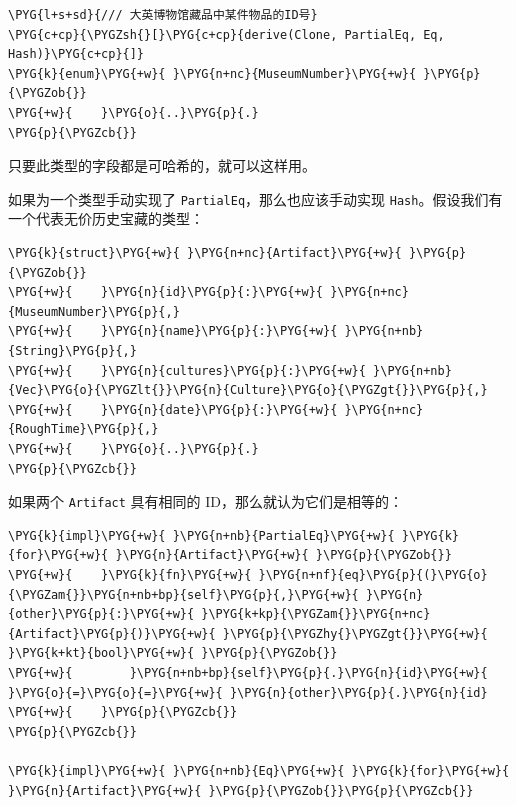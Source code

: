 \begin{Verbatim}[commandchars=\\\{\},breaklines=true,breakanywhere=true,fontsize=\codefont,xleftmargin=17bp]
\PYG{l+s+sd}{/// 大英博物馆藏品中某件物品的ID号}
\PYG{c+cp}{\PYGZsh{}[}\PYG{c+cp}{derive(Clone, PartialEq, Eq, Hash)}\PYG{c+cp}{]}
\PYG{k}{enum}\PYG{+w}{ }\PYG{n+nc}{MuseumNumber}\PYG{+w}{ }\PYG{p}{\PYGZob{}}
\PYG{+w}{    }\PYG{o}{..}\PYG{p}{.}
\PYG{p}{\PYGZcb{}}
\end{Verbatim}

只要此类型的字段都是可哈希的，就可以这样用。

如果为一个类型手动实现了 \texttt{PartialEq}，那么也应该手动实现 \texttt{Hash}。假设我们有一个代表无价历史宝藏的类型：

\begin{Verbatim}[commandchars=\\\{\},breaklines=true,breakanywhere=true,fontsize=\codefont,xleftmargin=17bp]
\PYG{k}{struct}\PYG{+w}{ }\PYG{n+nc}{Artifact}\PYG{+w}{ }\PYG{p}{\PYGZob{}}
\PYG{+w}{    }\PYG{n}{id}\PYG{p}{:}\PYG{+w}{ }\PYG{n+nc}{MuseumNumber}\PYG{p}{,}
\PYG{+w}{    }\PYG{n}{name}\PYG{p}{:}\PYG{+w}{ }\PYG{n+nb}{String}\PYG{p}{,}
\PYG{+w}{    }\PYG{n}{cultures}\PYG{p}{:}\PYG{+w}{ }\PYG{n+nb}{Vec}\PYG{o}{\PYGZlt{}}\PYG{n}{Culture}\PYG{o}{\PYGZgt{}}\PYG{p}{,}
\PYG{+w}{    }\PYG{n}{date}\PYG{p}{:}\PYG{+w}{ }\PYG{n+nc}{RoughTime}\PYG{p}{,}
\PYG{+w}{    }\PYG{o}{..}\PYG{p}{.}
\PYG{p}{\PYGZcb{}}
\end{Verbatim}

如果两个 \texttt{Artifact} 具有相同的 ID，那么就认为它们是相等的：

\begin{Verbatim}[commandchars=\\\{\},breaklines=true,breakanywhere=true,fontsize=\codefont,xleftmargin=17bp]
\PYG{k}{impl}\PYG{+w}{ }\PYG{n+nb}{PartialEq}\PYG{+w}{ }\PYG{k}{for}\PYG{+w}{ }\PYG{n}{Artifact}\PYG{+w}{ }\PYG{p}{\PYGZob{}}
\PYG{+w}{    }\PYG{k}{fn}\PYG{+w}{ }\PYG{n+nf}{eq}\PYG{p}{(}\PYG{o}{\PYGZam{}}\PYG{n+nb+bp}{self}\PYG{p}{,}\PYG{+w}{ }\PYG{n}{other}\PYG{p}{:}\PYG{+w}{ }\PYG{k+kp}{\PYGZam{}}\PYG{n+nc}{Artifact}\PYG{p}{)}\PYG{+w}{ }\PYG{p}{\PYGZhy{}\PYGZgt{}}\PYG{+w}{ }\PYG{k+kt}{bool}\PYG{+w}{ }\PYG{p}{\PYGZob{}}
\PYG{+w}{        }\PYG{n+nb+bp}{self}\PYG{p}{.}\PYG{n}{id}\PYG{+w}{ }\PYG{o}{=}\PYG{o}{=}\PYG{+w}{ }\PYG{n}{other}\PYG{p}{.}\PYG{n}{id}
\PYG{+w}{    }\PYG{p}{\PYGZcb{}}
\PYG{p}{\PYGZcb{}}

\PYG{k}{impl}\PYG{+w}{ }\PYG{n+nb}{Eq}\PYG{+w}{ }\PYG{k}{for}\PYG{+w}{ }\PYG{n}{Artifact}\PYG{+w}{ }\PYG{p}{\PYGZob{}}\PYG{p}{\PYGZcb{}}
\end{Verbatim}

